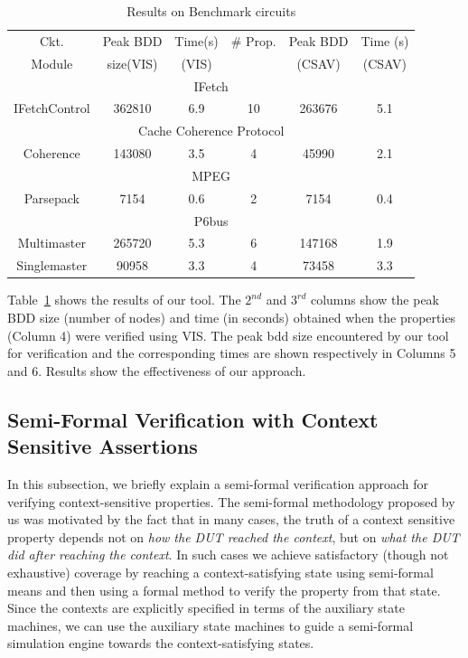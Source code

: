 \documentclass[a4paper, 11pt]{article}
\begin{document}
\begin{table}[htb]
\begin{center}
{\small
\begin{tabular}{|c|c|c|c|c|c|} \hline
Ckt. & Peak BDD & Time(s) & \# Prop. & Peak BDD & Time (s) \\
Module & size(VIS) & (VIS) & & (CSAV) & (CSAV) \\ \hline \hline
\multicolumn{6}{|c|}{IFetch} \\ \hline
IFetchControl   & 362810 & 6.9 & 10 & 263676 & 5.1    \\ \hline \hline
\multicolumn{6}{|c|}{Cache Coherence Protocol} \\ \hline
Coherence       & 143080 & 3.5 & 4 & 45990 & 2.1 \\ \hline \hline
\multicolumn{6}{|c|}{MPEG} \\ \hline
Parsepack      & 7154 & 0.6 & 2 & 7154 & 0.4 \\ \hline \hline
\multicolumn{6}{|c|}{P6bus} \\ \hline
Multimaster    & 265720 & 5.3 & 6 & 147168 & 1.9 \\ \hline \hline
Singlemaster   & 90958 & 3.3 & 4 & 73458 & 3.3 \\ \hline \hline
\end{tabular}
}
\end{center}
\caption{Results on Benchmark circuits} \label{tab2}
\end{table}

Table~\ref{tab2} shows the results of our tool. The $2^{nd}$ and 
$3^{rd}$ 
columns show the peak BDD size (number of nodes) and time (in seconds)
obtained when the properties (Column 4) were verified using
VIS. The peak bdd size encountered by our tool for
verification and the corresponding times are shown respectively in
Columns 5 and 6. Results show the effectiveness of our approach.

\subsection{Semi-Formal Verification with Context Sensitive Assertions} 
	\label{sec5.3}
In this subsection, we briefly explain a semi-formal verification approach 
for verifying
context-sensitive properties. The semi-formal methodology proposed by us was 
motivated by the fact that in many cases, the truth of a context
sensitive property depends not on {\em how the DUT reached the context},
but on {\em what the DUT did after reaching the context}. In such
cases we achieve satisfactory (though not exhaustive) coverage by
reaching a context-satisfying state using semi-formal means and then
using a formal method to verify the property from that state. Since
the contexts are explicitly specified in terms of the auxiliary state
machines, we can use the auxiliary state machines to guide a semi-formal
simulation engine towards the context-satisfying states.
\end{document}
